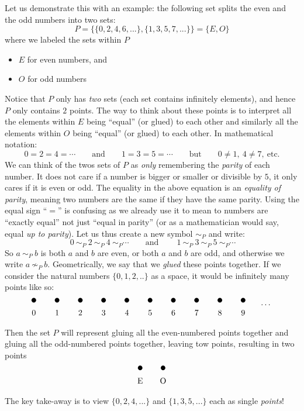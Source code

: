 \documentclass{article}
\begin{document}
Let us demonstrate this with an example: the following set splits the even and the odd
numbers into two sets:
\[
  P = \{\{0,2,4,6,...\}, \{1,3,5,7,...\}\} = \{E, O\}
\]
where we labeled the sets within $P$
\begin{itemize}
  \item $E$ for even numbers, and
  \item $O$ for odd numbers
\end{itemize}
Notice that $P$ only has \emph{two} sets (each set contains infinitely elements), and hence $P$ only contains
$2$ points. The way to think about these points is to interpret all the elements within $E$ being ``equal''
(or glued) to each other and similarly all the elements within $O$ being ``equal'' (or glued) to each other.
In mathematical notation:
\[
  0 = 2 = 4 = \cdots \qquad \text{and} \qquad 1 = 3 = 5 = \cdots \qquad \text{but} \qquad 0 \ne 1,\ 4\ne 7,\
  \text{etc.}
\]
We can think of the twos sets of $P$ as \emph{only} remembering the \emph{parity} of each number. It
does not care if a number is bigger or smaller or divisible by $5$, it only cares if it is even or odd. The
equality in the above equation is an \emph{equality of parity}, meaning two numbers are the same if they have
the same parity. Using the equal sign ``$=$'' is confusing as we already use it to mean to numbers are
``exactly equal'' not just ``equal in parity'' (or as a mathematician would say, equal \emph{up to parity}).
Let us thus create a new symbol $\sim_P$ and write:
\[
  \ 0\  \sim_P \ 2\  \sim_P \ 4\  \sim_P \cdots \qquad \text{and} \qquad \ 1\  \sim_P \ 3\  \sim_P \ 5\  \sim_P \cdots
\]
So $a\ \sim_P\ b$ is both $a$ and $b$ are even, or both $a$ and $b$ are odd, and otherwise we write $a\
\not\sim_P\ b$. Geometrically, we say that we \emph{glued} these points together. If we consider
the natural numbers $\{0,1,2,..\}$ as a space, it would be infinitely many points like so:
\[
\begin{tikzpicture}
  \foreach \x in {0,1,2,3,4,5,6,7,8,9} {
    \fill[black] (\x,0) circle (0.1);
    \node[below] at (\x,-0.3) {\x};
  }

  \node[below] at (10,0) {$\cdots$};
\end{tikzpicture}
\]
Then the set $P$ will represent gluing all the even-numbered points together and gluing all the odd-numbered
points together, leaving tow points, resulting in two points
\[
\begin{tikzpicture}
    \fill[black] (0,0) circle (0.1);
    \node[below] at (0,-0.3) {E};

    \fill[black] (1,0) circle (0.1);
    \node[below] at (1,-0.3) {O};

\end{tikzpicture}
\]
The key take-away is to view $\{0,2,4,...\}$ and $\{1,3,5,...\}$ each as single \emph{points}!
\end{document}
